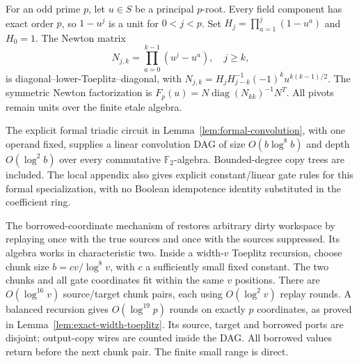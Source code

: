 \documentclass[11pt]{article}
\newcommand{\F}{\mathbb F}
\begin{document}
For an odd prime $p$, let $u\in S$ be a principal $p$-root. Every field
component has exact order $p$, so $1-u^j$ is a unit for $0<j<p$.
Set $H_j=\prod_{a=1}^j(1-u^a)$ and $H_0=1$. The Newton matrix
\[
 N_{j,k}=\prod_{a=0}^{k-1}(u^j-u^a),\quad j\ge k,
\]
is diagonal--lower-Toeplitz--diagonal, with
$N_{j,k}=H_jH_{j-k}^{-1}(-1)^k u^{k(k-1)/2}$.
The symmetric Newton factorization is
$F_p(u)=N\operatorname{diag}(N_{kk})^{-1}N^T$.
All pivots remain units over the finite etale algebra.

The explicit formal triadic circuit in
Lemma~\ref{lem:formal-convolution}, with one operand fixed, supplies a
linear convolution DAG of size $O(b\log^8b)$ and depth $O(\log^2b)$
over every commutative $\F_2$-algebra. Bounded-degree copy trees are
included. The local appendix also gives explicit constant/linear
gate rules for this formal specialization, with no Boolean
idempotence identity substituted in the coefficient ring.

The borrowed-coordinate mechanism of \cite{local} restores arbitrary
dirty workspace by replaying once with the true sources and once with
the sources suppressed. Its algebra works in characteristic two.
Inside a width-$v$ Toeplitz recursion, choose chunk size
$b=c v/\log^8v$, with $c$ a sufficiently small fixed constant. The
two chunks and all gate coordinates fit within the same $v$ positions.
There are $O(\log^{16}v)$ source/target chunk pairs, each using
$O(\log^2v)$ replay rounds. A balanced recursion gives
$O(\log^{19}p)$ rounds on exactly $p$ coordinates, as proved in
Lemma~\ref{lem:exact-width-toeplitz}. Its source, target and borrowed
ports are disjoint; output-copy wires are counted inside the DAG.
All borrowed values
return before the next chunk pair. The finite small range is direct.
\end{document}
